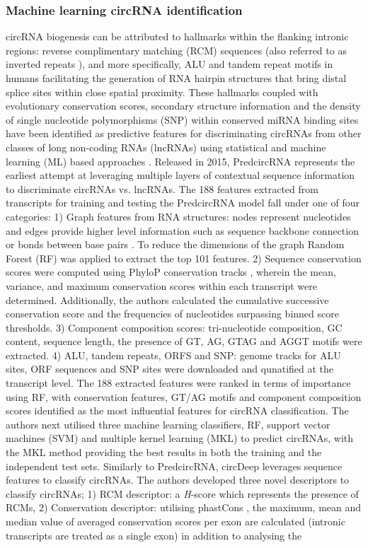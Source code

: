 \subsubsection{Machine learning circRNA identification}
circRNA biogenesis can be attributed to hallmarks within the flanking intronic regions: reverse complimentary matching (RCM) sequences \cite{Ivanov2015Jan} (also referred to as inverted repeats \cite{Dubin1995Dec}), and more specifically, ALU and tandem repeat motifs in humans \cite{Jeck2012Dec} facilitating the generation of RNA hairpin structures that bring distal splice sites within close spatial proximity. These hallmarks coupled with evolutionary conservation scores, secondary structure information and the density of single nucleotide polymorphisms (SNP) within conserved miRNA binding sites \cite{Thomas2014Aug} have been identified as predictive features for discriminating circRNAs from other classes of long non-coding RNAs (lncRNAs) using statistical and machine learning (ML) based approaches \cite{PredcircRNA,circDeep,StackCirRNAPred,CirRNAPL}. Released in 2015, PredcircRNA \cite{PredcircRNA} represents the earliest attempt at leveraging multiple layers of contextual sequence information to discriminate circRNAs vs. lncRNAs. The 188 features extracted from transcripts for training and testing the PredcircRNA model fall under one of four categories: 1) Graph features from RNA structures: nodes represent nucleotides and edges provide higher level information such as sequence backbone connection or bonds between base pairs \cite{GraphProt}. To reduce the dimensions of the graph Random Forest (RF) was applied to extract the top 101 features. 2) Sequence conservation scores were computed using PhyloP conservation tracks \cite{PhyloP}, wherein the mean, variance, and maximum conservation scores within each transcript were determined. Additionally, the authors calculated the cumulative successive conservation score and the frequencies of nucleotides surpassing binned score thresholds. 3) Component composition scores: tri-nucleotide composition, GC content, sequence length, the presence of GT, AG, GTAG and AGGT motifs were extracted. 4) ALU, tandem repeats, ORFS and SNP: genome tracks for ALU sites, ORF sequences and SNP sites were downloaded and qunatified at the transcript level. The 188 extracted features were ranked in terms of importance using RF, with conservation features, GT/AG motifs and component composition scores identified as the most influential features for circRNA classification. The authors next utilised three machine learning classifiers, RF, support vector machines (SVM) and multiple kernel learning (MKL) to predict circRNAs, with the MKL method providing the best results in both the training and the independent test sets. Similarly to PredcircRNA, circDeep \cite{circDeep} leverages sequence features to classify circRNAs. The authors developed three novel descriptors to classify circRNAs; 1) RCM descriptor: a \textit{H}-score which represents the presence of RCMs, 2) Conservation descriptor: utilising phastCons \cite{phastCons}, the maximum, mean and median value of averaged conservation scores per exon are calculated (intronic transcripts are treated as a single exon) in addition to analysing the 